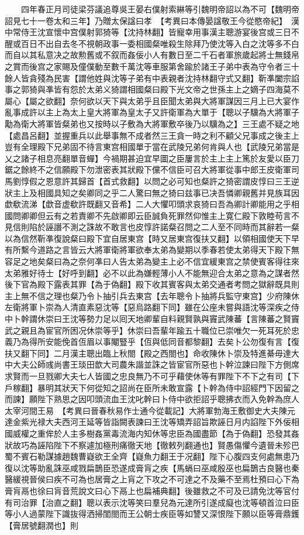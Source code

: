 　　四年春正月司徒梁芬議追尊吳王晏右僕射索綝等引魏明帝詔以為不可【魏明帝詔見七十一卷太和三年】乃贈太保諡曰孝　【考異曰本傳晏諡敬王今從愍帝紀】　漢中常侍王沈宣懷中宫僕射郭猗等【沈持林翻】皆寵幸用事漢主聰游宴後宫或三日不醒或百日不出自去冬不視朝政事一委相國粲唯殺生除拜乃使沈等入白之沈等多不白而自以其私意决之故勲舊或不叙而姦佞小人有數日至二千石者軍旅歲起將士無錢帛之賞而後宫之家賜及僮僕動至數千萬沈等車服第舍踰於諸王子弟中表為守令者三十餘人皆貪殘為民害【謂他姓與沈等子弟有中表親者沈持林翻守式又翻】靳凖闔宗諂事之郭猗與凖皆有怨於太弟义猗謂相國粲曰殿下光文帝之世孫主上之嫡子四海莫不屬心【屬之欲翻】奈何欲以天下與太弟乎且臣聞太弟與大將軍謀因三月上已大宴作亂事成許以主上為太上皇大將軍為皇太子又許衛軍為大單于【聰以子驥為大將軍子勱為衛大將軍皆粲弟也又按時以子敷為大將軍敷卒後乃以驥為之】三王處不疑之地【處昌呂翻】並握重兵以此舉事無不成者然三王貪一時之利不顧父兄事成之後主上豈有全理殿下兄弟固不待言東宫相國單于當在武陵兄弟何肯與人也【武陵兄弟當是乂之諸子相息亮翻單音蟬】今禍期甚迫宜早圖之臣屢言於主上主上篤於友愛以臣刀鋸之餘終不之信願殿下勿泄密表其狀殿下儻不信臣可召大將軍從事中郎王皮衛軍司馬劉惇假之恩意許其歸首【首式救翻】以問之必可知也粲許之猗密謂皮惇曰三王逆狀主上及相國具知之矣卿同之乎二人驚曰無之猗曰兹事已决吾憐卿親舊并見族耳因歔欷流涕【歔音虚欷許既翻又音希】二人大懼叩頭求哀猗曰吾為卿計卿能用之乎相國問卿卿但云有之若責卿不先啟卿即云臣誠負死罪然仰惟主上寛仁殿下敦睦苟言不見信則陷於誣譖不測之誅故不敢言也皮惇許諾粲召問之二人至不同時而其辭若一粲以為信然靳凖復說粲曰殿下宜自居東宫【時又居東宫復扶又翻】以領相國使天下早有所繫今道路之言皆云大將軍衛將軍欲奉太弟為變期以季春若使太弟得天下殿下無容足之地矣粲曰為之奈何凖曰人告太弟為變主上必不信宜緩東宫之禁使賓客得往來太弟雅好待士【好呼到翻】必不以此為嫌輕薄小人不能無迎合太弟之意為之謀者然後下官為殿下露表其罪【為于偽翻】殿下收其賓客與太弟交通者考問之獄辭既具則主上無不信之理也粲乃令卜抽引兵去東宫【去年聰令卜抽將兵監守東宫】少府陳休左衛將軍卜崇為人清直素惡沈等【惡烏路翻下同】雖在公座未嘗與語沈等深疾之侍中卜幹謂休崇曰王沈等勢力足以囘天地卿輩自料親賢孰與竇武陳蕃【言陳蕃之賢竇武之親且為宦官所困况休崇等乎】休崇曰吾輩年踰五十職位已崇唯欠一死耳死於忠義乃為得所安能俛首仾眉以事閹豎乎【仾與低同音都黎翻】去矣卜公勿復有言【復扶又翻下同】二月漢主聰出臨上秋閤【殿之西閤也】命收陳休卜崇及特進綦毋達大中大夫公師彧尚書王琰田歆大司農朱諧並誅之皆宦官所惡也卜幹泣諫曰陛下方側席求賢而一旦戮卿大夫七人皆國之忠良無乃不可乎藉使休等有罪陛下不下之有司【下戶稼翻】暴明其狀天下何從知之詔尚在臣所未敢宣露【卜幹為侍中詔經門下因留之而諫】願陛下熟思之因叩頭流血王沈叱幹曰卜侍中欲拒詔乎聰拂衣而入免幹為庶人太宰河間王易　【考異曰晉春秋易作士通今從載記】大將軍勃海王敷御史大夫陳元達金紫光禄大夫西河王延等皆詣闕表諫曰王沈等矯弄詔旨欺誣日月内諂陛下外佞相國威權之重侔於人主多樹姦黨毒流海内知休等忠臣為國盡節【為于偽翻】恐發其姦狀故巧為誣陷陛下不察遽加極刑痛徹天地【徹敕列翻通也】賢愚傷懼今遺晉未殄巴蜀不賓石勒謀據趙魏曹嶷欲王全齊【嶷魚力翻王于况翻】陛下心腹四支何處無患乃復以沈等助亂誅巫咸戮扁鵲臣恐遂成膏肓之疾【馬螎曰巫咸殷巫也扁鵲古良醫也秦醫緩視晉侯曰疾不可為也居膏之上肓之下攻之不可達之不及藥不至焉杜預曰心下為膏肓鬲也徐曰肓音荒說文曰心下鬲上也扁補典翻】後雖救之不可及已請免沈等官付有司治罪【治直之翻】聰以表示沈等笑曰羣兒為元達所引遂成癡也沈等頓首泣曰臣等小人過蒙陛下識抜得洒掃閨閤而王公朝士疾臣等如讐又深恨陛下願以臣等膏鼎鑊【膏居號翻潤也】則
